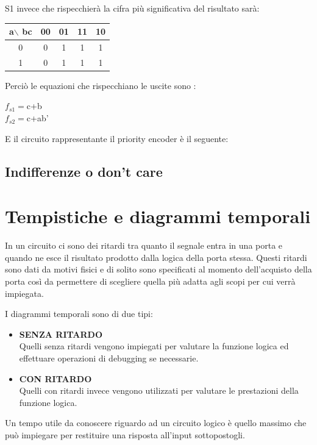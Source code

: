 \documentclass[a4paper]{book}
\begin{document}
S1 invece che rispecchierà la cifra più significativa del risultato sarà:

\begin{tabular}{|c|c|c|c|c|}
a$\backslash$ bc & 00 & 01 & 11 & 10 \\
\hline
0              & 0  & \cellcolor{yellow}1  &  \cellcolor{yellow}1 & \cellcolor{yellow}1  \\
\hline
1              & 0  & \cellcolor{yellow}1  &  \cellcolor{yellow}1 & \cellcolor{yellow}1  \\
\hline

\end{tabular}


Perciò le equazioni che rispecchiano le uscite sono :

\(f_{s1}=\)c+b \\
\(f_{s2}=\)c+ab'


E il circuito rappresentante il priority encoder è il seguente:


\section{Indifferenze o don't care}

\chapter{Tempistiche e diagrammi temporali}

In un circuito ci sono dei ritardi tra quanto il segnale entra in una porta e quando ne esce il risultato prodotto dalla logica della porta stessa.
Questi ritardi sono dati da motivi fisici e di solito sono specificati al momento dell'acquisto della porta così da permettere di scegliere quella più adatta agli scopi per cui verrà impiegata.

I diagrammi temporali sono di due tipi:
 
\begin{itemize}
\item\textbf{SENZA RITARDO}\\
Quelli senza ritardi vengono impiegati per valutare la funzione logica ed effettuare operazioni di debugging se necessarie.\\
\item\textbf{CON RITARDO}\\
Quelli con ritardi invece vengono utilizzati per valutare le prestazioni della funzione logica.\\
\end{itemize}
Un tempo utile da conoscere riguardo ad un circuito logico è quello massimo che può impiegare per restituire una risposta all'input sottopostogli.
\end{document}
